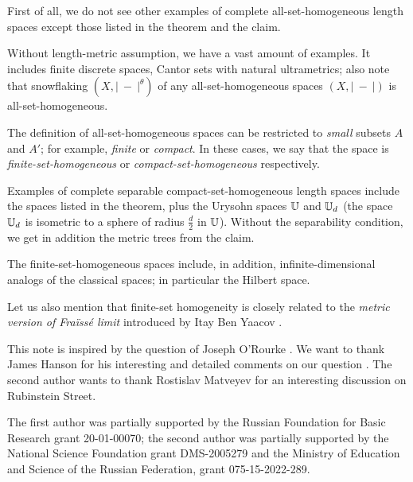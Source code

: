 \documentclass[a4paper,10pt]{article}
\begin{document}
First of all, we do not see other examples of complete all-set-homogeneous length spaces except those listed in the theorem and the claim.

Without length-metric assumption, we have a vast amount of examples.
It includes finite discrete spaces, Cantor sets with natural ultrametrics;
also note that snowflaking $(X,|\ -\ |^\theta)$ of any all-set-homogeneous spaces $(X,|\ -\ |)$ is all-set-homogeneous.

The definition of all-set-homogeneous spaces can be restricted to \emph{small} subsets $A$ and $A'$; for example, \emph{finite} or \emph{compact}.
In these cases, we say that the space is \emph{finite-set-homogeneous} or \emph{compact-set-homogeneous} respectively.

Examples of complete separable compact-set-homogeneous length spaces include the spaces listed in the theorem,
plus the Urysohn spaces $\mathbb{U}$ and $\mathbb{U}_d$ (the space $\mathbb{U}_d$ is isometric to a sphere of radius $\tfrac d2$ in $\mathbb{U}$).
Without the separability condition, we get in addition the metric trees from the claim.

The finite-set-homogeneous spaces include, in addition, infinite-dimensional analogs of the classical spaces;
in particular the Hilbert space.  

Let us also mention that finite-set homogeneity is closely related to the \emph{metric version of Fraïssé limit} introduced by Itay Ben Yaacov \cite{ben-yaacov}. 

This note is inspired by the question of Joseph O'Rourke \cite{rourke}.
We want to thank James Hanson for his interesting and detailed comments on our question \cite{hanson}.
The second author wants to thank Rostislav Matveyev for an interesting discussion on Rubinstein Street. 

The first author was partially supported by the Russian Foundation for Basic Research grant 20-01-00070; the second author was partially supported by the National Science Foundation grant DMS-2005279 and the Ministry of Education and Science of the Russian Federation, grant 075-15-2022-289.

{\sloppy
\printbibliography[heading=bibintoc]
\fussy
}
\end{document}
